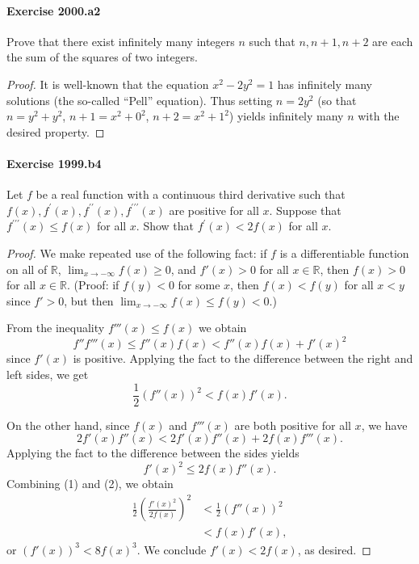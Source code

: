 \documentclass{article}
\begin{document}
\paragraph{Exercise 2000.a2} Prove that there exist infinitely many integers $n$ such that $n, n+1, n+2$ are each the sum of the squares of two integers. 
\begin{proof}
    It is well-known that the equation $x^2-2y^2=1$ has infinitely
many solutions (the so-called ``Pell'' equation).  Thus setting
$n=2y^2$ (so that $n=y^2+y^2$, $n+1=x^2+0^2$, $n+2=x^2+1^2$)
yields infinitely many $n$ with the desired property.
\end{proof}



\paragraph{Exercise 1999.b4} Let $f$ be a real function with a continuous third derivative such that $f(x), f^{\prime}(x), f^{\prime \prime}(x), f^{\prime \prime \prime}(x)$ are positive for all $x$. Suppose that $f^{\prime \prime \prime}(x) \leq f(x)$ for all $x$. Show that $f^{\prime}(x)<2 f(x)$ for all $x$.
\begin{proof}    
\setcounter{equation}{0}
We make repeated use of the following fact: if $f$ is a differentiable function on all of
$\mathbb{R}$, $\lim_{x \to -\infty} f(x) \geq 0$, and $f'(x) > 0$ for all $x \in \mathbb{R}$, then
$f(x) > 0$ for all $x \in \mathbb{R}$. (Proof: if $f(y) < 0$ for some $x$, then $f(x)< f(y)$ for all
$x<y$ since $f'>0$, but then $\lim_{x \to -\infty} f(x) \leq f(y) < 0$.)

From the inequality $f'''(x) \leq f(x)$ we obtain
\[
f'' f'''(x) \leq f''(x) f(x) < f''(x) f(x) + f'(x)^2
\]
since $f'(x)$ is positive. Applying the fact to the difference between the right and left sides,
we get
\begin{equation}
\frac{1}{2} (f''(x))^2 < f(x) f'(x).
\end{equation}

On the other hand, since $f(x)$ and $f'''(x)$ are both positive for all $x$,
we have
\[
2f'(x) f''(x) < 2f'(x)f''(x) + 2f(x) f'''(x).
\]
Applying the fact to the difference between the sides yields
\begin{equation}
f'(x)^2 \leq 2f(x) f''(x).
\end{equation}
Combining (1) and (2), we obtain
\begin{align*}
\frac{1}{2} \left( \frac{f'(x)^2}{2f(x)} \right)^2
&< \frac{1}{2} (f''(x))^2 \\
&< f(x) f'(x),
\end{align*}
or $(f'(x))^3 < 8 f(x)^3$. We conclude $f'(x) < 2f(x)$, as desired.
\end{proof}
\end{document}
